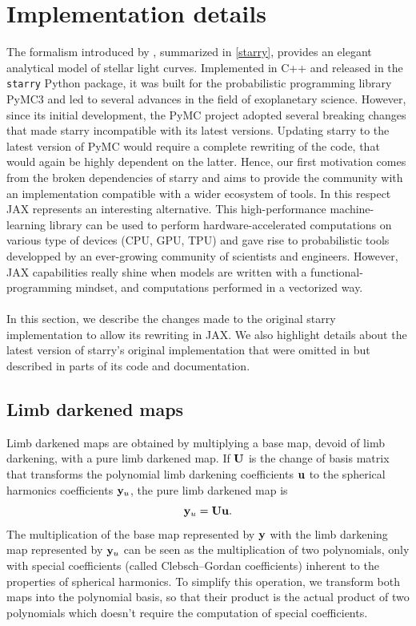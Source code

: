 \documentclass[modern]{aastex631}
\begin{document}
\section{Implementation details}\label{optimization}
The formalism introduced by \cite{starry}, summarized in \autoref{starry}, provides an elegant analytical model of stellar light curves. Implemented in C++ and released in the \texttt{starry} Python package, it was built for the probabilistic programming library \textsf{PyMC3} and led to several advances in the field of exoplanetary science. However, since its initial development, the \textsf{PyMC} project adopted several breaking changes that made \textsf{starry} incompatible with its latest versions. Updating \textsf{starry} to the latest version of \textsf{PyMC} would require a complete rewriting of the code, that would again be highly dependent on the latter. Hence, our first motivation comes from the broken dependencies of \textsf{starry} and aims to provide the community with an implementation compatible with a wider ecosystem of tools. In this respect \textsf{JAX} represents an interesting alternative. This high-performance machine-learning library can be used to perform hardware-accelerated computations on various type of devices (CPU, GPU, TPU) and gave rise to probabilistic tools developped by an ever-growing community of scientists and engineers. However, \textsf{JAX} capabilities really shine when models are written with a functional-programming mindset, and computations performed in a vectorized way.\\\\
In this section, we describe the changes made to the original \textsf{starry} implementation to allow its rewriting in \textsf{JAX}. We also highlight details about the latest version of \textsf{starry}'s original implementation that were omitted in \citealt{starry} but described in parts of its code and documentation. 

\subsection{Limb darkened maps}
Limb darkened maps are obtained by multiplying a base map, devoid of limb darkening, with a pure limb darkened map. If ${\mathbf{U}}$ is the change of basis matrix that transforms the polynomial limb darkening coefficients ${\mathbf{u}}$ to the spherical harmonics coefficients ${\mathbf{y}}_u$, the pure limb darkened map is
\begin{equation}
    \label{eq:limb_darkening_map}
    \bvec{y}_u = \bvec{U}\bvec{u}.
\end{equation}
The multiplication of the base map represented by ${\mathbf{y}}$ with the limb darkening map represented by ${\mathbf{y}}_u$ can be seen as the multiplication of two polynomials, only with special coefficients (called Clebsch–Gordan coefficients) inherent to the properties of spherical harmonics. To simplify this operation, we transform both maps into the polynomial basis, so that their product is the actual product of two polynomials which doesn't require the computation of special coefficients.
\end{document}
